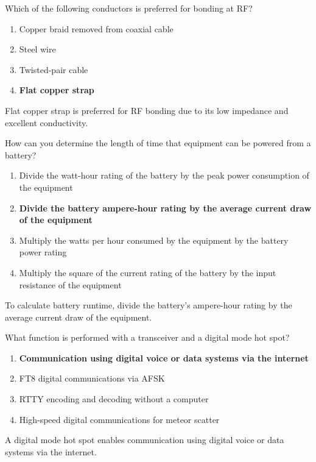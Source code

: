 \begin{tcolorbox}[colback=gray!10!white,colframe=black!75!black,title={T4A08}]
    Which of the following conductors is preferred for bonding at RF?
    \begin{enumerate}[label=\Alph*),noitemsep]
        \item Copper braid removed from coaxial cable
        \item Steel wire
        \item Twisted-pair cable
        \item \textbf{Flat copper strap}
    \end{enumerate}
\end{tcolorbox}
Flat copper strap is preferred for RF bonding due to its low impedance and excellent conductivity.

\begin{tcolorbox}[colback=gray!10!white,colframe=black!75!black,title={T4A09}]
    How can you determine the length of time that equipment can be powered from a battery?
    \begin{enumerate}[label=\Alph*),noitemsep]
        \item Divide the watt-hour rating of the battery by the peak power consumption of the equipment
        \item \textbf{Divide the battery ampere-hour rating by the average current draw of the equipment}
        \item Multiply the watts per hour consumed by the equipment by the battery power rating
        \item Multiply the square of the current rating of the battery by the input resistance of the equipment
    \end{enumerate}
\end{tcolorbox}
To calculate battery runtime, divide the battery's ampere-hour rating by the average current draw of the equipment.

\begin{tcolorbox}[colback=gray!10!white,colframe=black!75!black,title={T4A10}]
    What function is performed with a transceiver and a digital mode hot spot?
    \begin{enumerate}[label=\Alph*),noitemsep]
        \item \textbf{Communication using digital voice or data systems via the internet}
        \item FT8 digital communications via AFSK
        \item RTTY encoding and decoding without a computer
        \item High-speed digital communications for meteor scatter
    \end{enumerate}
\end{tcolorbox}
A digital mode hot spot enables communication using digital voice or data systems via the internet.

